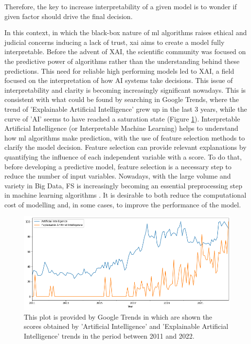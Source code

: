 Therefore, the key to increase interpretability of a given model is to wonder if given factor should drive the final decision.\par
In this context, in which the black-box nature of \acrshort{ml} algorithms raises ethical and judicial concerns inducing a lack of trust\cite{9141213}, \gls{xai} aims to create a model fully interpretable.
Before the advent of XAI, the scientific community was focused on the predictive power of algorithms rather than the understanding behind these predictions.
This need for reliable high performing models led to XAI, a field focused on the interpretation of how AI systems take decisions.
This issue of interpretability and clarity is becoming increasingly significant nowadays. 
This is consistent with what could be found by searching in Google Trends, where the trend of 'Explainable Artificial Intelligence' grew up in the last 3 years, while the curve of 'AI' seems to have reached a saturation state (Figure \ref{fig:AI_XAI}).
Interpretable Artificial Intelligence (or Interpretable Machine Learning) helps to understand how \acrshort{ml} algorithms make prediction, with the use of feature selection methods to clarify the model decision.
Feature selection can provide relevant explanations by quantifying the influence of each independent variable with a score.
To do that, before developing a predictive model, feature selection is a necessary step to reduce the number of input variables. \newline
Nowadays, with the large volume and variety in Big Data, FS is increasingly becoming an essential preprocessing step in machine learning algorithms \cite{kamolov2021feature}.
It is desirable to both reduce the computational cost of modelling and, in some cases, to improve the performance of the model.\newline
\begin{figure}[H]
    \includegraphics[scale=0.50]{images/AI_XAI.png}
    \caption{This plot is provided by Google Trends in which are shown the scores obtained by 'Artificial Intelligence' and 'Explainable Artificial Intelligence' trends in the period between 2011 and 2022.}
    \label{fig:AI_XAI}
\end{figure}
